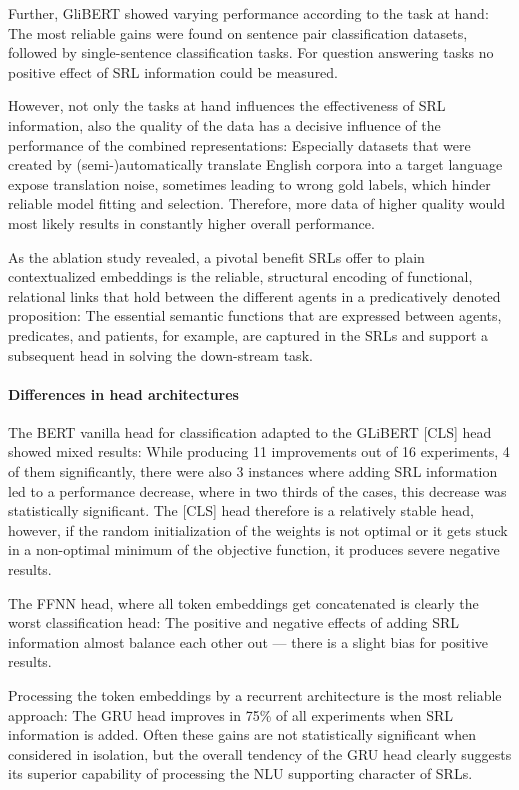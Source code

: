 {Further, GliBERT showed varying performance according to the task at hand: The most reliable
gains were found on sentence pair classification datasets, followed
by single-sentence classification tasks. For question answering tasks no positive
effect of SRL information could be measured.

However, not only the tasks at hand influences the effectiveness of SRL information,
also the quality of the data has a decisive influence of the performance of the
combined representations: Especially datasets that were created by (semi-)automatically
translate English corpora into a target language expose translation noise, sometimes
leading to wrong gold labels, which hinder reliable model fitting and selection. Therefore,
more data of higher quality would most likely results in constantly higher overall performance.

As the ablation study revealed, a pivotal benefit SRLs offer to plain contextualized embeddings is
the reliable, structural encoding of functional, relational links that hold between the different
agents in a predicatively denoted proposition: The essential semantic functions that are expressed
between agents, predicates, and patients, for example, are captured in the SRLs and support a
subsequent head in solving the down-stream task.


\paragraph*{Differences in head architectures}

The BERT vanilla head for classification adapted to the GLiBERT [CLS] head showed mixed results:
While producing 11 improvements out of 16 experiments, 4 of them significantly, there were also
3 instances where adding SRL information led to a performance decrease, where in two thirds of
the cases, this decrease was statistically significant. The [CLS] head therefore is a relatively
stable head, however, if the random initialization of the weights is not optimal or it gets stuck
in a non-optimal minimum of the objective function, it produces severe negative results.

The FFNN head, where all token embeddings get concatenated is clearly the worst classification
head: The positive and negative effects of adding SRL information almost balance each other out
--- there is a slight bias for positive results.

Processing the token embeddings by a recurrent architecture is the most reliable approach: The GRU
head improves in 75\% of all experiments when SRL information is added. Often these gains are not
statistically significant when considered in isolation, but the overall tendency of the GRU head
clearly suggests its superior capability of processing the NLU supporting character of SRLs.

}
